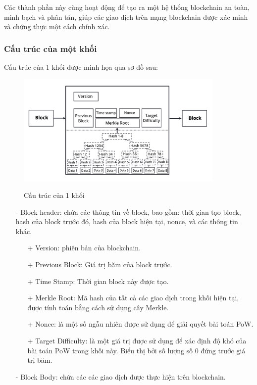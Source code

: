 Các thành phần này cùng hoạt động để tạo ra một hệ thống blockchain an toàn, minh bạch và phân tán, giúp các giao dịch trên mạng blockchain được xác minh và chứng thực một cách chính xác.

\subsubsection{Cấu trúc của một khối}


Cấu trúc của 1 khối được minh họa qua sơ đồ sau:
\begin{figure}[h]
    \centering
    \includegraphics[width=0.9\textwidth]{images/Cau_truc_khoi.png}
    \label{fig:cau_truc_khoi}
    \caption{Cấu trúc của 1 khối}
\end{figure}

\begin{itemize}
    \item[-] Block header: chứa các thông tin về block, bao gồm: thời gian tạo block, hash của block trước đó, hash của block hiện tại, nonce, và các thông tin khác.
    \begin{itemize}
        \item[+] Version: phiên bản của blockchain.
        \item[+] Previous Block: Giá trị băm của block trước.
        \item[+] Time Stamp: Thời gian block này được tạo.
        \item[+] Merkle Root: Mã hash của tất cả các giao dịch trong khối hiện tại, 
        được tính toán bằng cách sử dụng cây Merkle.
        \item[+] Nonce: là một số ngẫu nhiên được sử dụng để giải quyết bài toán PoW.
        \item[+] Target Difficulty: là một giá trị được sử dụng để xác định độ khó của bài toán PoW trong khối này. 
        Biểu thị bởi số lượng số 0 đứng trước giá trị băm. 
    \end{itemize}
    \item[-] Block Body: chứa các các giao dịch được thực hiện trên blockchain.
\end{itemize}

